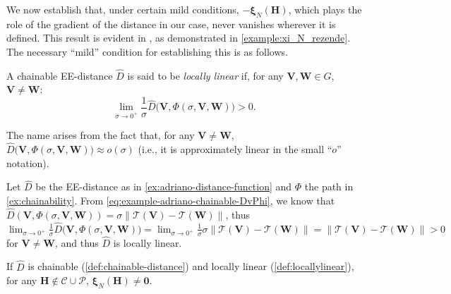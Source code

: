 We now establish that, under certain mild conditions, $-\boldsymbol{\xi}_N(\mathbf{H})$, which plays the role of the gradient of the distance in our case, never vanishes wherever it is defined. This result is evident in \citet{Rezende2022}, as demonstrated in \cref{example:xi_N_rezende}. The necessary ``mild'' condition for establishing this is as follows.

\begin{definition}  \label{def:locallylinear}
    A chainable EE-distance $\widehat{D}$ is said to be \emph{locally linear} if, for any $\mathbf{V}, \mathbf{W} \in G$, $\mathbf{V} \not = \mathbf{W}$:
    \begin{equation}
        \lim_{\sigma \rightarrow 0^+} \frac{1}{\sigma} \widehat{D}\bigl(\mathbf{V},\Phi(\sigma,\mathbf{V},\mathbf{W})\bigr) > 0.
    \end{equation}
\end{definition}
The name arises from the fact that, for any $\mathbf{V} \not= \mathbf{W}$, $\widehat{D}\bigl(\mathbf{V},\Phi(\sigma,\mathbf{V},\mathbf{W})\bigr) \approx o(\sigma)$ (i.e., it is approximately linear in the small ``$o$'' notation).

\begin{example}
    Let $\widehat{D}$ be the EE-distance as in \cref{ex:adriano-distance-function} and $\Phi$ the path in \cref{ex:chainability}. From \eqref{eq:example-adriano-chainable-DvPhi}, we know that $\widehat{D}(\mathbf{V}, \Phi(\sigma, \mathbf{V}, \mathbf{W})) = \sigma\|\mathcal{T}(\mathbf{V}) - \mathcal{T}(\mathbf{W})\|$, thus $\lim_{\sigma \to 0^+} \frac{1}{\sigma} \widehat{D}\bigl(\mathbf{V},\Phi(\sigma,\mathbf{V},\mathbf{W})\bigr) = \lim_{\sigma \to 0^+} \frac{1}{\sigma}\sigma\|\mathcal{T}(\mathbf{V}) - \mathcal{T}(\mathbf{W})\| = \|\mathcal{T}(\mathbf{V}) - \mathcal{T}(\mathbf{W})\| > 0$ for $\mathbf{V} \not= \mathbf{W}$, and thus $\widehat{D}$ is locally linear.
\end{example}

\begin{lemma} \label{lemma:no-zero-xiN} If $\widehat{D}$ is chainable (\cref{def:chainable-distance}) and locally linear (\cref{def:locallylinear}), for any $\mathbf{H} \notin \mathcal{C} \cup \mathcal{P}$, $\boldsymbol{\xi}_N(\mathbf{H}) \not= \mathbf{0}$.
\end{lemma}

